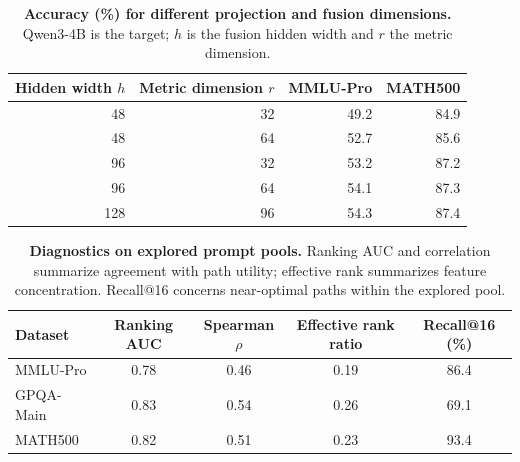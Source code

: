 \begin{table}[ht]
\caption{\textbf{Accuracy (\%) for different projection and fusion dimensions.}
Qwen3-4B is the target; $h$ is the fusion hidden width and $r$ the metric dimension.}
\label{app-tab: (h,r)}
\centering\small
\begin{tabular}{@{}rrrr@{}}
\toprule
Hidden width $h$ & Metric dimension $r$ & MMLU-Pro & MATH500\\ \midrule
48 & 32 & 49.2 & 84.9\\
48 & 64 & 52.7 & 85.6\\
96 & 32 & 53.2 & 87.2\\
96 & 64 & 54.1 & 87.3\\
128 & 96 & 54.3 & 87.4\\ \bottomrule
\end{tabular}
\end{table}

\begin{table}[t]
\caption{\textbf{Diagnostics on explored prompt pools.}
Ranking AUC and correlation summarize agreement with path utility; effective rank summarizes feature concentration.
Recall@16 concerns near-optimal paths within the explored pool.}
\label{tab:theory_diagnostics_main}
\centering
\small
\begin{tabular}{@{}lcccc@{}}
\toprule
Dataset & Ranking AUC & Spearman $\rho$ & Effective rank ratio & Recall@16 (\%) \\ \midrule
MMLU-Pro & 0.78 & 0.46 & 0.19 & 86.4 \\
GPQA-Main & 0.83 & 0.54 & 0.26 & 69.1 \\
MATH500 & 0.82 & 0.51 & 0.23 & 93.4 \\
\bottomrule
\end{tabular}

\end{table}

